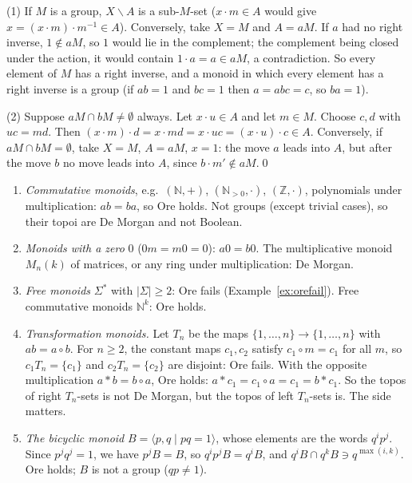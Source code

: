 \direct{} (1) If $M$ is a group, $X\smallsetminus A$ is a sub-$M$-set ($x\cdot m\in A$ would give $x = (x\cdot m)\cdot m^{-1}\in A$). Conversely, take $X = M$ and $A = aM$. If $a$ had no right inverse, $1\notin aM$, so $1$ would lie in the complement; the complement being closed under the action, it would contain $1\cdot a = a\in aM$, a contradiction. So every element of $M$ has a right inverse, and a monoid in which every element has a right inverse is a group (if $ab = 1$ and $bc = 1$ then $a = abc = c$, so $ba = 1$).

(2) Suppose $aM\cap bM\neq\emptyset$ always. Let $x\cdot u\in A$ and let $m\in M$. Choose $c,d$ with $uc = md$. Then $(x\cdot m)\cdot d = x\cdot md = x\cdot uc = (x\cdot u)\cdot c\in A$. Conversely, if $aM\cap bM = \emptyset$, take $X = M$, $A = aM$, $x = 1$: the move $a$ leads into $A$, but after the move $b$ no move leads into $A$, since $b\cdot m'\notin aM$.\qed

\begin{example}\label{ex:monoidlist}
\begin{enumerate}
\item \emph{Commutative monoids}, e.g.\ $(\mathbb N,+)$, $(\mathbb N_{>0},\cdot)$, $(\mathbb Z,\cdot)$, polynomials under multiplication: $ab = ba$, so Ore holds. Not groups (except trivial cases), so their topoi are De Morgan and not Boolean.
\item \emph{Monoids with a zero} $0$ ($0m = m0 = 0$): $a0 = b0$. The multiplicative monoid $M_n(k)$ of matrices, or any ring under multiplication: De Morgan.
\item \emph{Free monoids} $\Sigma^*$ with $|\Sigma|\ge 2$: Ore fails (Example~\ref{ex:orefail}). Free commutative monoids $\mathbb N^k$: Ore holds.
\item \emph{Transformation monoids.} Let $T_n$ be the maps $\{1,\dots,n\}\to\{1,\dots,n\}$ with $ab = a\circ b$. For $n\ge 2$, the constant maps $c_1, c_2$ satisfy $c_1\circ m = c_1$ for all $m$, so $c_1T_n = \{c_1\}$ and $c_2T_n = \{c_2\}$ are disjoint: Ore fails. With the opposite multiplication $a\ast b = b\circ a$, Ore holds: $a\ast c_1 = c_1\circ a = c_1 = b\ast c_1$. So the topos of right $T_n$-sets is not De Morgan, but the topos of left $T_n$-sets is. The side matters.
\item \emph{The bicyclic monoid} $B = \langle p,q\mid pq = 1\rangle$, whose elements are the words $q^ip^j$. Since $p^jq^j = 1$, we have $p^jB = B$, so $q^ip^jB = q^iB$, and $q^iB\cap q^kB\ni q^{\max(i,k)}$. Ore holds; $B$ is not a group ($qp\neq 1$).
\end{enumerate}
\end{example}

